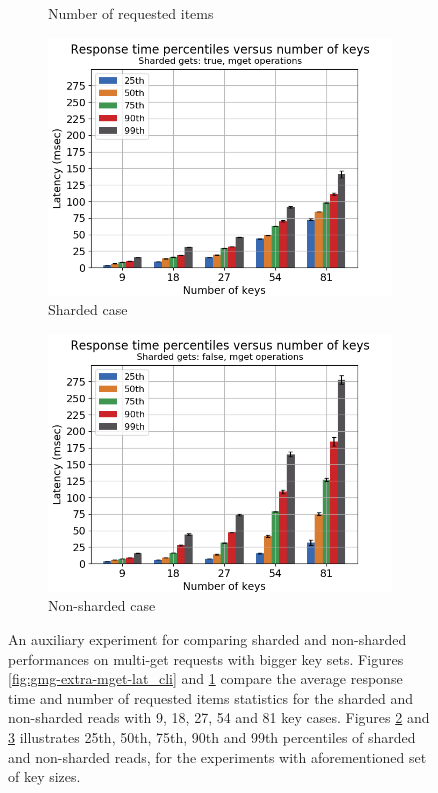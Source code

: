 \documentclass[11pt,a4paper]{article}
\begin{document}
\begin{figure}[h!]
\begin{subfigure}{.5\textwidth}
  \caption{Number of requested items}
  \label{fig:gmg-extra-mget-nitems_cli}
\end{subfigure}
\begin{subfigure}{.5\textwidth}
  \centering
  \includegraphics[width=1.0\linewidth ,trim={5px 0px 20px 0px},clip]{img/plot/gmg-extra-perc-mget-true.png}
  \caption{Sharded case}
  \label{fig:gmg-extra-perc-mget-true}
\end{subfigure}%
\begin{subfigure}{.5\textwidth}
  \centering
  \includegraphics[width=1.0\linewidth ,trim={5px 0px 20px 0px},clip]{img/plot/gmg-extra-perc-mget-false.png}
  \caption{Non-sharded case}
  \label{fig:gmg-extra-perc-mget-false}
\end{subfigure}
\caption{An auxiliary experiment for comparing sharded and non-sharded performances on multi-get requests with bigger key sets. Figures \ref{fig:gmg-extra-mget-lat_cli} and \ref{fig:gmg-extra-mget-nitems_cli} compare the average response time and number of requested items statistics for the sharded and non-sharded reads with 9, 18, 27, 54 and 81 key cases. Figures \ref{fig:gmg-extra-perc-mget-true} and \ref{fig:gmg-extra-perc-mget-false} illustrates 25th, 50th, 75th, 90th and 99th percentiles of sharded and non-sharded reads, for the experiments with aforementioned set of key sizes.}
\label{fig:gmg-extra}
\end{figure}
\end{document}
